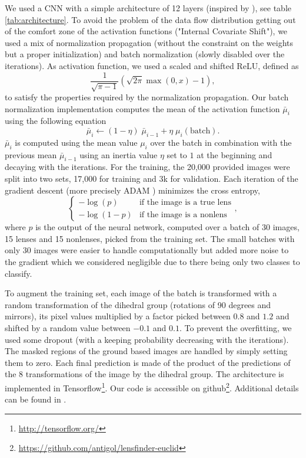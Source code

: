 \documentclass{aa}
\begin{document}
We used a CNN \citep{Fukushima1980,Lecun1998} with a simple architecture of 12 layers (inspired by \citep{symmetry}), see table \ref{tab:architecture}.
To avoid the problem of the data flow distribution getting out of the comfort zone of the activation functions ("Internal Covariate Shift"), we used a mix of normalization propagation \citep{norm_prop} (without the constraint on the weights but a proper initialization) and batch normalization \citep{batch_norm} (slowly disabled over the iterations).
As activation function, we used a scaled and shifted ReLU, defined as
\begin{equation} \label{eq:relu}
    \frac{1}{\sqrt{\pi-1}} (\sqrt{2 \pi} \max(0,x) - 1),
\end{equation}
to satisfy the properties required by the normalization propagation.
Our batch normalization implementation computes the mean of the activation function $\bar\mu_i$ using the following equation 
\begin{equation} \label{eq:batchnorm}
    \bar\mu_i \longleftarrow (1-\eta) \; \bar\mu_{i-1} + \eta \; \mu_i(\text{batch}).
\end{equation}
$\bar\mu_i$ is computed using the mean value $\mu_i$ over the batch in combination with the previous mean $\bar\mu_{i-1}$ using an inertia value $\eta$ set to $1$ at the beginning and decaying with the iterations.
For the training, the 20,000 provided images were split into two sets, 17,000 for training and 3k for validation.
Each iteration of the gradient descent (more precisely ADAM \citep{adam}) minimizes the cross entropy, 
\begin{equation} \label{eq:xent}
    \left\{
    \begin{array}{ll}
        - \log(p)   & \text{if the image is a true lens} \\
        - \log(1-p) & \text{if the image is a nonlens}
    \end{array}
    \right.,
\end{equation}
where $p$ is the output of the neural network, computed over a batch of 30 images, 15 lenses and 15 nonlenses, picked from the training set.
The small batches with only 30 images were easier to handle computationally but added more noise to the gradient which we considered negligible due to there being only two classes to classify.

To augment the training set, each image of the batch is transformed with a random transformation of the dihedral group (rotations of 90 degrees and mirrors), its pixel values multiplied by a factor picked between $0.8$ and $1.2$ and shifted by a random value between $-0.1$ and $0.1$.
To prevent the overfitting, we used some dropout \citep{dropout} (with a keeping probability decreasing with the iterations).
The masked regions of the ground based images are handled by simply setting them to zero.
Each final prediction is made of the product of the predictions of the 8 transformations of the image by the dihedral group.
The architecture is implemented in Tensorflow\footnote{\url{http://tensorflow.org/}}.
Our code is accessible on github\footnote{\url{https://github.com/antigol/lensfinder-euclid}}. Additional details can be found in \citet{2017Schaefer}.
\end{document}
